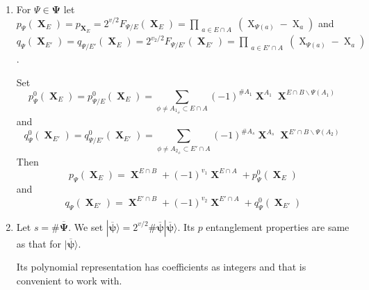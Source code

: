 \documentclass[a4paper,12pt]{article}
\DeclareMathOperator{\x}{\mathrm{X}}
\theoremstyle{definition}
\theoremstyle{underlinethm}
\theoremstyle{definition}
\begin{document}
\begin{enumerate}[label=(\alph*)]
\item For $\Psi \in {\boldsymbol{\Psi}}$ let $p_{\Psi} ({\boldsymbol{\x}}_{E}) = p_{\boldsymbol{\x}_{E}}= 2^{v/2}F_{\Psi/E}({\boldsymbol{\x}}_{E})= \prod\limits_{\substack{a\in E \cap A}}(\x_{\Psi(a)}- \x_{a})$ and $q_{\Psi}({\boldsymbol{\x}}_{E'}) = q_{\Psi/E'}(\boldsymbol{\x}_{E}) = 2^{v_{2}/2} F_{\Psi/E'} ({\boldsymbol{\x}}_{E'}) = \prod\limits_{\substack{a \in E' \cap A}} (\x_{\Psi(a)} - \x_{a})$.

Set 
\begin{equation}
p^{0}_{\Psi}(\boldsymbol{\x}_{E}) = p^{0}_{\Psi/E}(\boldsymbol{\x}_{E}) = \sum_{\phi \neq A_{1_{\neq}} \subset E \cap A}(-1)^{\# A_{1}} {\boldsymbol{\x}^{A_{1}}} {\boldsymbol{\x}^{E \cap B \smallsetminus \Psi(A_{1})}}\tag{3.22}\label{eq-3.22}
\end{equation}
and 
\begin{equation}
q_{\Psi}^{0} (\boldsymbol{\x}_{E'}) = q^{0}_{\Psi/E'}(\boldsymbol{\x}_{E'})= \sum_{\phi \neq A_{2_{\neq}} \subset E' \cap A}(-1)^{\# A_{s}} {\boldsymbol{\x}^{A_{s}}} {\boldsymbol{\x}^{E' \cap B \smallsetminus \Psi(A_{2})}}\tag{3.23}\label{eq-3.23}
\end{equation}
Then
\begin{equation}
p_{\Psi}(\boldsymbol{\x}_{E}) = \boldsymbol{\x}^{E \cap B} + (-1)^{v_{1}} \boldsymbol{\x}^{E \cap A} + p^{0}_{\Psi}(\boldsymbol{\x}_{E})\tag{3.24}
\end{equation}
and
\begin{equation}
q_{\Psi}(\boldsymbol{\x}_{E'}) = \boldsymbol{\x}^{E' \cap B} + (-1)^{v_{2}} \boldsymbol{\x}^{E' \cap A} + q^{0}_{\Psi}(\boldsymbol{\x}_{E'})\tag{3.25}
\end{equation}

\item Let $s= \# \overline{\boldsymbol{\Psi}}$. We set $| \overline{\boldsymbol{\psi}} \rangle = 2^{v/2} \# \overline{\boldsymbol{\psi}} |\overline{\boldsymbol{\psi}} \rangle$. Its $p$ entanglement properties are same as that for $| \overline{\boldsymbol{\psi}} \rangle$.

Its polynomial representation has coefficients as integers and that is convenient to work with.


\end{enumerate}
\end{document}
